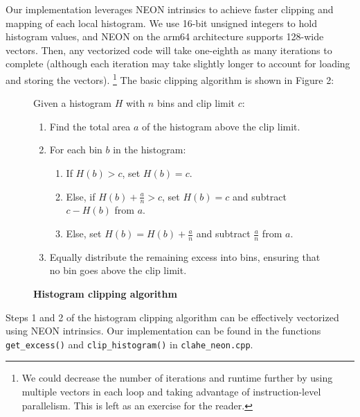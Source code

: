 \documentclass[10pt,twocolumn,letterpaper]{article}
\begin{document}
Our implementation leverages NEON intrinsics to achieve faster clipping and mapping of each local histogram. We use 16-bit unsigned integers to hold histogram values, and NEON on the arm64 architecture supports 128-wide vectors. Then, any vectorized code will take one-eighth as many iterations to complete (although each iteration may take slightly longer to account for loading and storing the vectors). \footnote{We could decrease the number of iterations and runtime further by using multiple vectors in each loop and taking advantage of instruction-level parallelism. This is left as an exercise for the reader.} The basic clipping algorithm is shown in Figure 2:
\begin{figure}[h]
\caption{\textbf{Histogram clipping algorithm}}
Given a histogram $H$ with $n$ bins and clip limit $c$:
\begin{enumerate}
\itemsep0em 
\item Find the total area $a$ of the histogram above the clip limit.
\item For each bin $b$ in the histogram:
	\begin{enumerate}
	\itemsep0em 
	\item If $H(b) > c$, set $H(b) = c$.
	\item Else, if $H(b) + \frac{a}{n} > c$, set $H(b) = c$ and subtract $c - H(b)$ from $a$.
	\item Else, set $H(b) = H(b) + \frac{a}{n}$ and subtract $\frac{a}{n}$ from $a$.
	\end{enumerate}
\item Equally distribute the remaining excess into bins, ensuring that no bin goes above the clip limit.
\end{enumerate}
\end{figure}

Steps 1 and 2 of the histogram clipping algorithm can be effectively vectorized using NEON intrinsics. Our implementation can be found in the functions \verb"get_excess()" and \verb"clip_histogram()" in \verb"clahe_neon.cpp". 
\end{document}
